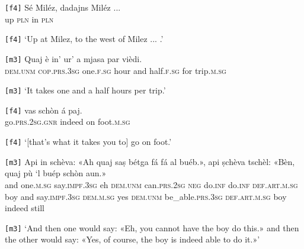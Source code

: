 \begin{linenumbers}
	\gll \texttt{[f4]} Sé Miléz, dadajns Miléz ... \\
	{} up \textsc{pln} in \textsc{pln}\\
\end{linenumbers}
\medskip
\glt \texttt{[f4]} `Up at Milez, to the west of Milez ... .'
\medskip

\begin{linenumbers}
	\gll \texttt{[m3]} Quaj è in’ ur’ a mjasa par vièdi.  \\
	{} \textsc{dem.unm} \textsc{cop.prs.3sg} one.\textsc{f.sg} hour and half.\textsc{f.sg} for trip.\textsc{m.sg}\\
\end{linenumbers}
\medskip
\glt \texttt{[m3]} `It takes one and a half hours per trip.'
\medskip

\begin{linenumbers}
	\gll \texttt{[f4]} vas schòn á paj.   \\
	{} go.\textsc{prs.2sg.gnr} indeed on foot.\textsc{m.sg} \\
\end{linenumbers}
\medskip
\glt \texttt{[f4]} `[that's what it takes you to] go on foot.'
\medskip

\begin{linenumbers}
	\gll \texttt{[m3]} Api in schèva: «Ah quaj saṣ  bétga fá fá al buéb.», api ṣchèva tschèl: «Bèn, quaj pù `l buép schòn aun.»   \\
	{} and one.\textsc{m.sg} say.\textsc{impf.3sg} eh \textsc{dem.unm} can.\textsc{prs.2sg} \textsc{neg} do.\textsc{inf} do.\textsc{inf} \textsc{def.art.m.sg} boy and say.\textsc{impf.3sg} \textsc{dem.m.sg} yes \textsc{dem.unm} be\_able.\textsc{prs.3sg} \textsc{def.art.m.sg} boy indeed still\\
\end{linenumbers}
\medskip
\glt \texttt{[m3]} `And then one would say: «Eh, you cannot have the boy do this.» and then the other would say: «Yes, of course, the boy is indeed able to do it.»'
\medskip

